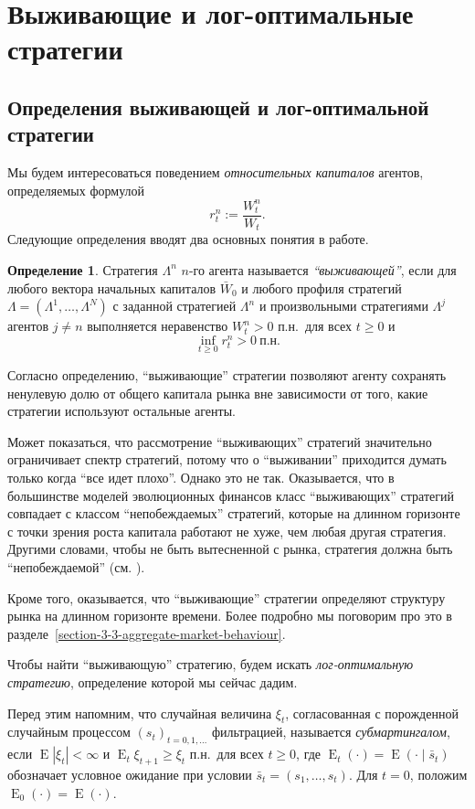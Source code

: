 \documentclass[a4paper,12pt,russian]{article} %
\theoremstyle{definition}
\newtheorem{definition}{Определение}
\DeclareMathOperator{\E}{E}
\begin{document}
\section{Выживающие и лог-оптимальные стратегии}
\label{section3-main-results}


\subsection{Определения выживающей и лог-оптимальной стратегии}
\label{section3-1-def-survival}
Мы будем интересоваться поведением \textit{относительных капиталов} агентов, определяемых формулой
\[
r_t^n := \frac{W_t^n}{W_t}.
\]
Следующие определения вводят два основных понятия в работе.

\begin{definition}
Стратегия $\Lambda^n$ $n$-го агента называется \emph{``выживающей''}, если для любого вектора начальных капиталов $\bar W_0$ и любого профиля стратегий $\Lambda=(\Lambda^1,\ldots,\Lambda^N)$ с заданной стратегией $\Lambda^n$ и произвольными стратегиями $\Lambda^j$ агентов $j\neq n$ выполняется неравенство $W_t^n > 0$ п.н.\ для всех $t\ge 0$ и 
\[
\inf_{t\ge 0} r_t^n > 0\ \text{п.н.}
\]
\end{definition}

Согласно определению, ``выживающие'' стратегии позволяют агенту сохранять ненулевую долю от общего капитала рынка вне зависимости от того, какие стратегии используют остальные агенты.

Может показаться, что рассмотрение ``выживающих'' стратегий значительно ограничивает спектр стратегий, потому что о ``выживании'' приходится думать только когда ``все идет плохо''. Однако это не так. Оказывается, что в большинстве моделей эволюционных финансов класс ``выживающих'' стратегий совпадает с классом ``непобеждаемых'' стратегий, которые на длинном горизонте с точки зрения роста капитала работают не хуже, чем любая другая стратегия. Другими словами, чтобы не быть вытесненной с рынка, стратегия должна быть ``непобеждаемой'' (см. \cite{EvstigneevEvolFinance2016}).

Кроме того, оказывается, что ``выживающие'' стратегии определяют структуру рынка на длинном горизонте времени. Более подробно мы поговорим про это в разделе~\ref{section-3-3-aggregate-market-behaviour}.

Чтобы найти ``выживающую'' стратегию, будем искать \emph{лог-оптимальную стратегию}, определение которой мы сейчас дадим.

Перед этим напомним, что случайная величина $\xi_t$, согласованная с порожденной случайным процессом $(s_t)_{t= 0,1, \dots} $ фильтрацией, называется \emph{субмартингалом}, если $\E|\xi_t| < \infty$ и $\E_t\xi_{t+1} \ge \xi_t$ п.н.\ для всех $t\ge 0$, где $\E_t(\cdot) = \E(\cdot\mid \bar s_t)$ обозначает условное ожидание при условии $\bar s_t=(s_1,\dots,s_t)$.
Для $t=0$, положим $\E_0(\cdot) = \E(\cdot)$.
\end{document}
